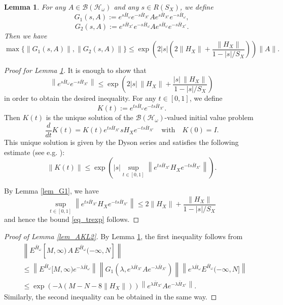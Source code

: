 \documentclass[11pt]{article}
\numberwithin{equation}{section}
\newtheorem{lemma}[theorem]{Lemma}
\begin{document}
\begin{lemma}\label{lem_G}
For any $A\in\mathcal{B}(\mathcal{H}_\omega)$ and any $s\in R(S_X)$, we define
\[
G_1(s,A):=e^{s\bar{H}_\omega} e^{-s\bar{H}_{X^c}} A e^{s\bar{H}_{X^c}} e^{-s\bar{H}_\omega},
\]
\[
G_2(s,A):=e^{s\bar{H}_{X^c}} e^{-s\bar{H}_\omega} A e^{s\bar{H}_\omega}e^{-s\bar{H}_{X^c}}.
\]
Then we have 
\[
\max\{\|G_1(s,A)\|,\|G_2(s,A)\|\}
\leq \exp\left(2|s| \left( 2\|H_X\|+\frac{\|H_X\|}{1-|s|/S_X}\right)\right) \|A\|.
\]
\end{lemma}
\begin{proof}[Proof for Lemma \ref{lem_G}]
It is enough to show that
\begin{equation}\label{eq_trexp}
\left\|
e^{s\bar{H}_\omega}e^{-s\bar{H}_{X^c}}
\right\|
\leq \exp\left(2|s|\,\|H_X\|+\frac{|s|\,\|H_X\|}{1-|s|/S_X}
\right)
\end{equation}
in order to obtain the desired inequality. For any $t\in[0,1]$, we define
\[
K(t):=e^{ts\bar{H}_\omega}e^{-ts\bar{H}_{X^c}}.
\]
Then $K(t)$ is the unique solution of the $\mathcal{B}(\mathcal{H}_\omega)$-valued initial value problem
\[
\frac{d}{dt}K(t)=K(t) e^{ts\bar{H}_{X^c}} sH_X e^{-ts\bar{H}_{X^c}}
\quad\text{with}\quad K(0)=I. 
\]
This unique solution is given by the Dyson series and satisfies the following estimate (see e.g. \cite[Proposition 2.2]{Nachtergaele-Sims-Young}):
\[
\|K(t)\|\leq \exp\left(
|s| \sup_{t\in[0,1]}
\left\|
e^{ts\bar{H}_{X^c}} H_X e^{-ts\bar{H}_{X^c}}
\right\|\right).
\]

By Lemma \ref{lem_G1}, we have 
\[
\sup_{t\in[0,1]}
\left\|
e^{ts\bar{H}_{X^c}} H_X e^{-ts\bar{H}_{X^c}}
\right\|
\leq 2\|H_X\|+\frac{\|H_X\|}{1-|s|/S_X}
\]
and hence the bound \eqref{eq_trexp} follows.
\end{proof}

\begin{proof}[Proof of Lemma \ref{lem_AKL2}]
By Lemma \ref{lem_G}, the first inequality follows from
\begin{align*}
&\left\|E^{\bar{H}_\omega}[M,\infty)
\,A\,
E^{\bar{H}_\omega}(-\infty,N]\right\|\\
&\leq \left\|E^{\bar{H}_\omega}[M,\infty) e^{-\lambda \bar{H}_\omega}\right\|
\left\|G_1\left(\lambda,e^{\lambda\bar{H}_{X^c}}Ae^{-\lambda\bar{H}_{X^c}}\right)\right\|
\left\|e^{\lambda \bar{H}_\omega}E^{\bar{H}_\omega}(-\infty,N]
\right\|\\
&\leq\exp(-\lambda(M-N-8\|H_X\|)) \left\|e^{\lambda\bar{H}_{X^c}}Ae^{-\lambda\bar{H}_{X^c}}\right\|.
\end{align*}
Similarly, the second inequality can be obtained in the same way.
\end{proof}
\end{document}
